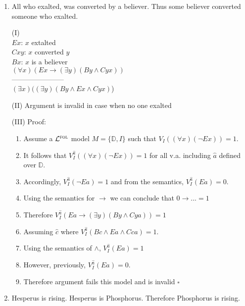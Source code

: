 \documentclass[12pt]{article}
\newcommand{\set}[1]{\lbrace#1\rbrace} %
\newcommand{\FOL}{\mathcal{L}^{\textsc{fol}}} %
\newcommand{\answer}[1]{%
  \par\noindent
  \begin{tcolorbox}[colback=gray!10, colframe=gray!80, title=Proof]
    #1
  \end{tcolorbox}
}
\begin{document}
\begin{enumerate}
{    }
  \pagebreak
  \item	All who exalted, was converted by a believer. Thus some believer converted someone who exalted.
    \answer{
      \begin{flushleft}
        (I) \\
        $Ex$: $x$ extalted \\
        $Cxy$: $x$ converted $y$ \\
        $Bx$: $x$ is a believer \\
        \bigskip
        $(\forall x)(Ex \rightarrow (\exists y)(By \land Cyx))$ \\
        ----------------------- \\
        $(\exists x)((\exists y)(By \land Ex \land Cyx)$)
      \end{flushleft}
      (II) Argument is invalid in case when no one exalted
      \bigskip
      
      (III) Proof:
      \begin{enumerate}[label=\arabic*.]
        \item Assume a $\FOL$ model $M=\set{\mathbb{D},I}$ such that $V_I((\forall x)(\lnot Ex))=1$.
        \item It follows that $V^{\hat{a}}_I((\forall x)(\lnot Ex))=1$ for all v.a. including $\hat{a}$ defined over $\mathbb{D}$.
        \item Accordingly, $V^{\hat{a}}_I(\lnot Ea)=1$ and from the semantics, $V^{\hat{a}}_I(Ea)=0$.
        \item Using the semantics for $\rightarrow$ we can conclude that $0\rightarrow...=1$
        \item Therefore $V^{\hat{a}}_I(Ea \rightarrow (\exists y)(By \land Cya))=1$
        \item Assuming $\hat{c}$ where $V^{\hat{a}}_I(Bc \land Ea \land Cca)=1$.
        \item Using the semantics of $\land$, $V^{\hat{a}}_I(Ea)=1$
        \item However, previously, $V^{\hat{a}}_I(Ea)=0$.
        \item Therefore argument fails this model and is invalid $\square$
      \end{enumerate}
    }
  \item	Hesperus is rising. Hesperus is Phosphorus. Therefore Phosphorus is rising.


\end{enumerate}
\end{document}

